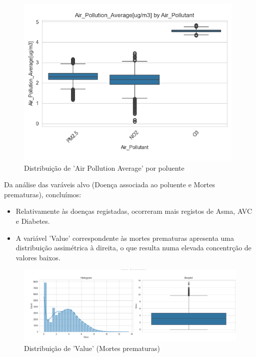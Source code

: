 \documentclass[conference]{IEEEtran}
\begin{document}
\begin{figure}[H]
	\centering
	\includegraphics[width=0.8\linewidth]{AirPollutionAvgByPollutant}
	\caption{Distribuição de 'Air Pollution Average' por poluente}
	\label{fig:AvgByPollutant}
\end{figure}

Da análise das varáveis alvo (Doença associada ao poluente e Mortes prematuras), concluímos:
\begin{itemize}
	\item Relativamente às doenças registadas, ocorreram mais registos de Asma, AVC e Diabetes.
	\item A variável 'Value' correspondente às mortes prematuras apresenta uma distribuição assimétrica à direita, o que resulta numa elevada concentrção de valores baixos.
\end{itemize}

\begin{figure}[H]
	\centering
	\includegraphics[width=0.8\linewidth]{ValueDist}
	\caption{Distribuição de 'Value' (Mortes prematuras)}
	\label{fig:AvgByCountry}
\end{figure}
\end{document}
